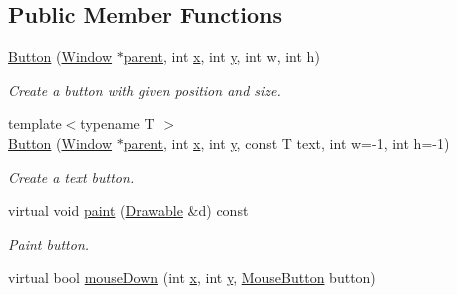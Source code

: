 \subsection*{Public Member Functions}
\begin{DoxyCompactItemize}
\item 
\hypertarget{classGUI_1_1Button_aed8c4c6050d6dc28984f6406263543b6}{\hyperlink{classGUI_1_1Button_aed8c4c6050d6dc28984f6406263543b6}{Button} (\hyperlink{classGUI_1_1Window}{Window} $\ast$\hyperlink{classGUI_1_1Window_a2e593ff65e7702178d82fe9010a0b539}{parent}, int \hyperlink{classGUI_1_1Window_a6ca6a80ca00c9e1d8ceea8d3d99a657d}{x}, int \hyperlink{classGUI_1_1Window_a0ee8e923aff2c3661fc2e17656d37adf}{y}, int w, int h)}\label{classGUI_1_1Button_aed8c4c6050d6dc28984f6406263543b6}

\begin{DoxyCompactList}\small\item\em Create a button with given position and size. \end{DoxyCompactList}\item 
{\footnotesize template$<$typename T $>$ }\\\hyperlink{classGUI_1_1Button_ae926c70573aa8418b56810689470d2b3}{Button} (\hyperlink{classGUI_1_1Window}{Window} $\ast$\hyperlink{classGUI_1_1Window_a2e593ff65e7702178d82fe9010a0b539}{parent}, int \hyperlink{classGUI_1_1Window_a6ca6a80ca00c9e1d8ceea8d3d99a657d}{x}, int \hyperlink{classGUI_1_1Window_a0ee8e923aff2c3661fc2e17656d37adf}{y}, const T text, int w=-\/1, int h=-\/1)
\begin{DoxyCompactList}\small\item\em Create a text button. \end{DoxyCompactList}\item 
\hypertarget{classGUI_1_1Button_a1cdd40f407ae7629533ec4db2c3d60e0}{virtual void \hyperlink{classGUI_1_1Button_a1cdd40f407ae7629533ec4db2c3d60e0}{paint} (\hyperlink{classGUI_1_1Drawable}{Drawable} \&d) const }\label{classGUI_1_1Button_a1cdd40f407ae7629533ec4db2c3d60e0}

\begin{DoxyCompactList}\small\item\em Paint button. \end{DoxyCompactList}\item 
\hypertarget{classGUI_1_1Button_a944916852caa22ff81139fff0ca0335a}{virtual bool \hyperlink{classGUI_1_1Button_a944916852caa22ff81139fff0ca0335a}{mouse\-Down} (int \hyperlink{classGUI_1_1Window_a6ca6a80ca00c9e1d8ceea8d3d99a657d}{x}, int \hyperlink{classGUI_1_1Window_a0ee8e923aff2c3661fc2e17656d37adf}{y}, \hyperlink{namespaceGUI_ad06082a7b02aa73697f39eb8e0856de9}{Mouse\-Button} button)}\label{classGUI_1_1Button_a944916852caa22ff81139fff0ca0335a}


\end{DoxyCompactItemize}
